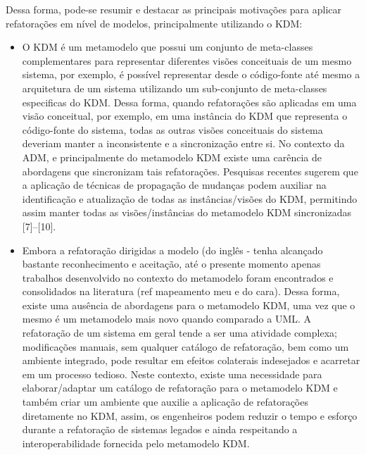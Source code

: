 Dessa forma, pode-se resumir e destacar as principais motivações para aplicar refatorações em nível de modelos, principalmente utilizando o KDM:

\begin{itemize}
	\item O KDM é um metamodelo que possui um conjunto de meta-classes complementares para representar diferentes visões conceituais de um mesmo sistema, por exemplo, é possível representar desde o código-fonte até mesmo a arquitetura de um sistema utilizando um sub-conjunto de meta-classes especificas do KDM. Dessa forma, quando refatorações são aplicadas em uma visão conceitual, por exemplo, em uma instância do KDM que representa o código-fonte do sistema, todas as outras visões conceituais do sistema deveriam manter a inconsistente e a sincronização entre si. No contexto da ADM, e principalmente do metamodelo KDM existe uma carência de abordagens que sincronizam tais refatorações. Pesquisas recentes sugerem que a aplicação de técnicas de propagação de mudanças podem auxiliar na identificação e atualização de todas as instâncias/visões do KDM, permitindo assim manter todas as visões/instâncias do metamodelo KDM sincronizadas [7]–[10].  

	\item Embora a refatoração dirigidas a modelo (do inglês -  tenha alcançado bastante reconhecimento e aceitação, até o presente momento apenas trabalhos desenvolvido no contexto do metamodelo  foram encontrados e consolidados na literatura (ref mapeamento meu e do cara). Dessa forma, existe uma ausência de abordagens para o metamodelo KDM, uma vez que o mesmo é um metamodelo mais novo quando comparado a UML. A refatoração de um sistema em geral tende a ser uma atividade complexa; modificações manuais, sem qualquer catálogo de refatoração, bem como um ambiente integrado, pode resultar em efeitos colaterais indesejados e acarretar em um processo tedioso. Neste contexto, existe uma necessidade para elaborar/adaptar um catálogo de refatoração para o metamodelo KDM e também criar um ambiente que auxilie a aplicação de refatorações diretamente no KDM, assim, os engenheiros podem reduzir o tempo e esforço durante a refatoração de sistemas legados e ainda respeitando a interoperabilidade fornecida pelo metamodelo KDM.


\end{itemize}
